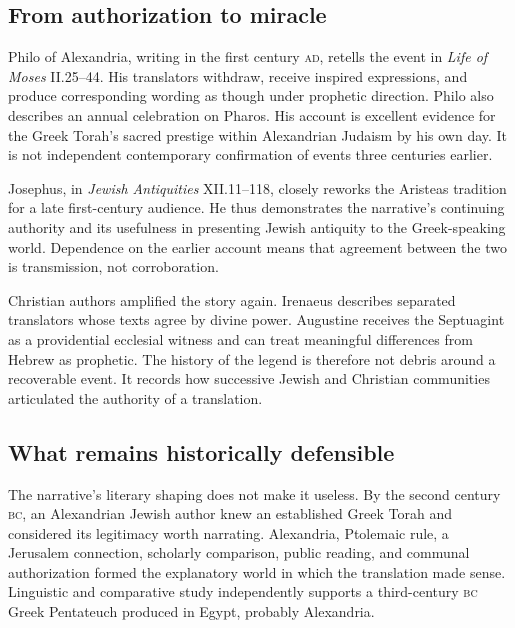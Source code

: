 
\subsection{From authorization to miracle}

Philo of Alexandria, writing in the first century \textsc{ad}, retells the event in \emph{Life of Moses} II.25--44. His translators withdraw, receive inspired expressions, and produce corresponding wording as though under prophetic direction. Philo also describes an annual celebration on Pharos. His account is excellent evidence for the Greek Torah's sacred prestige within Alexandrian Judaism by his own day. It is not independent contemporary confirmation of events three centuries earlier.

Josephus, in \emph{Jewish Antiquities} XII.11--118, closely reworks the Aristeas tradition for a late first-century audience. He thus demonstrates the narrative's continuing authority and its usefulness in presenting Jewish antiquity to the Greek-speaking world. Dependence on the earlier account means that agreement between the two is transmission, not corroboration.

Christian authors amplified the story again. Irenaeus describes separated translators whose texts agree by divine power. Augustine receives the Septuagint as a providential ecclesial witness and can treat meaningful differences from Hebrew as prophetic. The history of the legend is therefore not debris around a recoverable event. It records how successive Jewish and Christian communities articulated the authority of a translation.

\subsection{What remains historically defensible}

The narrative's literary shaping does not make it useless. By the second century \textsc{bc}, an Alexandrian Jewish author knew an established Greek Torah and considered its legitimacy worth narrating. Alexandria, Ptolemaic rule, a Jerusalem connection, scholarly comparison, public reading, and communal authorization formed the explanatory world in which the translation made sense. Linguistic and comparative study independently supports a third-century \textsc{bc} Greek Pentateuch produced in Egypt, probably Alexandria.

